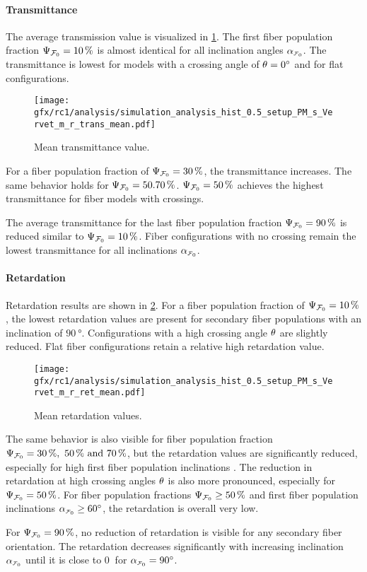 \paragraph{Transmittance}
% 
The average transmission value is visualized in \cref{fig:sim_ana_trans}.
The first fiber population fraction $\textnormal{$\Psi_{\textnormal{$\mathcal{F}_0$}}$}=\SI{10}{\percent}$ is almost identical for all inclination angles $\modelInc$.
The transmittance is lowest for models with a crossing angle of $\textnormal{$\theta$} = \SI{0}{\degree}$ and for flat configurations.
\par
% 
\begin{figure}[!p]
\centering
\texttt{[image: gfx/rc1/analysis/simulation\_analysis\_hist\_0.5\_setup\_PM\_s\_Vervet\_m\_r\_trans\_mean.pdf]}
\caption{Mean transmittance value.}
\label{fig:sim_ana_trans}
\end{figure}
%
For a fiber population fraction of $\textnormal{$\Psi_{\textnormal{$\mathcal{F}_0$}}$}=\SI{30}{\percent}$, the transmittance increases.
The same behavior holds for $\modelPsi=\SIlist{50,70}{\percent}$.
$\textnormal{$\Psi_{\textnormal{$\mathcal{F}_0$}}$}=\SI{50}{\percent}$ achieves the highest transmittance for fiber models with crossings.
\par
% 
The average transmittance for the last fiber population fraction $\textnormal{$\Psi_{\textnormal{$\mathcal{F}_0$}}$}=\SI{90}{\percent}$ is reduced similar to $\textnormal{$\Psi_{\textnormal{$\mathcal{F}_0$}}$}=\SI{10}{\percent}$.
Fiber configurations with no crossing remain the lowest transmittance for all inclinations $\modelInc$.
%
% 
% 
\paragraph{Retardation}
% 
Retardation results are shown in \cref{fig:sim_ana_ret}.
For a fiber population fraction of $\textnormal{$\Psi_{\textnormal{$\mathcal{F}_0$}}$}=\SI{10}{\percent}$, the lowest retardation values are present for secondary fiber populations with an inclination of $\SI{90}{\degree}$.
Configurations with a high crossing angle $\textnormal{$\theta$}$ are slightly reduced.
Flat fiber configurations retain a relative high retardation value.
\par
% 
\begin{figure}[!p]
\centering
\texttt{[image: gfx/rc1/analysis/simulation\_analysis\_hist\_0.5\_setup\_PM\_s\_Vervet\_m\_r\_ret\_mean.pdf]}
\caption{Mean retardation values.}
\label{fig:sim_ana_ret}
\end{figure}
%
The same behavior is also visible for fiber population fraction $\modelPsi=\SIlist{30;50;70}{\percent}$, but the retardation values are significantly reduced, especially for high first fiber population inclinations \modelInc{}.
The reduction in retardation at high crossing angles $\textnormal{$\theta$}$ is also more pronounced, especially for $\textnormal{$\Psi_{\textnormal{$\mathcal{F}_0$}}$}=\SI{50}{\percent}$.
For fiber population fractions $\textnormal{$\Psi_{\textnormal{$\mathcal{F}_0$}}$} \geq \SI{50}{\percent}$ and first fiber population inclinations $\modelInc \geq \SI{60}{\degree}$, the retardation is overall very low.
\par
%
For $\textnormal{$\Psi_{\textnormal{$\mathcal{F}_0$}}$}=\SI{90}{\percent}$, no reduction of retardation is visible for any secondary fiber orientation.
The retardation decreases significantly with increasing inclination $\modelInc$ until it is close to $\SI{0}{}$ for $\modelInc=\SI{90}{\degree}$.
% 
% 
% 
